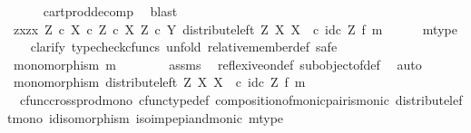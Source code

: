 \begin{isabellebody}
\ \ \ \ \isamarkupfalse%
\ cart{\isacharunderscore}{\kern0pt}prod{\isacharunderscore}{\kern0pt}decomp\ \isamarkupfalse%
\ blast\isanewline
\ \ \isamarkupfalse%
\ \isamarkupfalse%
\ {\isachardoublequoteopen}{\isasymlangle}zx{\isacharcomma}{\kern0pt}zx{\isasymrangle}\ {\isasymin}\isactrlbsub {\isacharparenleft}{\kern0pt}Z\ {\isasymtimes}\isactrlsub c\ X{\isacharparenright}{\kern0pt}\ {\isasymtimes}\isactrlsub c\ Z\ {\isasymtimes}\isactrlsub c\ X\isactrlesub \ {\isacharparenleft}{\kern0pt}Z\ {\isasymtimes}\isactrlsub c\ Y{\isacharcomma}{\kern0pt}\ distribute{\isacharunderscore}{\kern0pt}left\ Z\ X\ X\ \ {\isasymcirc}\isactrlsub c\ {\isacharparenleft}{\kern0pt}id\isactrlsub c\ Z\ {\isasymtimes}\isactrlsub f\ m{\isacharparenright}{\kern0pt}{\isacharparenright}{\kern0pt}{\isachardoublequoteclose}\isanewline
\ \ \ \ \isamarkupfalse%
\ m{\isacharunderscore}{\kern0pt}type\isanewline
\ \ \isamarkupfalse%
\ {\isacharparenleft}{\kern0pt}clarify{\isacharcomma}{\kern0pt}\ typecheck{\isacharunderscore}{\kern0pt}cfuncs{\isacharcomma}{\kern0pt}\ unfold\ relative{\isacharunderscore}{\kern0pt}member{\isacharunderscore}{\kern0pt}def{}{\isacharcomma}{\kern0pt}\ safe{\isacharparenright}{\kern0pt}\isanewline
\ \ \ \ \isamarkupfalse%
\ {\isachardoublequoteopen}monomorphism\ m{\isachardoublequoteclose}\isanewline
\ \ \ \ \ \ \isamarkupfalse%
\ assms\ \isamarkupfalse%
\ reflexive{\isacharunderscore}{\kern0pt}on{\isacharunderscore}{\kern0pt}def\ subobject{\isacharunderscore}{\kern0pt}of{\isacharunderscore}{\kern0pt}def{}\ \isamarkupfalse%
\ auto\isanewline
\ \ \ \ \isamarkupfalse%
\ \isamarkupfalse%
\ {\isachardoublequoteopen}monomorphism\ {\isacharparenleft}{\kern0pt}distribute{\isacharunderscore}{\kern0pt}left\ Z\ X\ X\ \ {\isasymcirc}\isactrlsub c\ {\isacharparenleft}{\kern0pt}id\isactrlsub c\ Z\ {\isasymtimes}\isactrlsub f\ m{\isacharparenright}{\kern0pt}{\isacharparenright}{\kern0pt}{\isachardoublequoteclose}\isanewline
\ \ \ \ \ \ \isamarkupfalse%
\ \ cfunc{\isacharunderscore}{\kern0pt}cross{\isacharunderscore}{\kern0pt}prod{\isacharunderscore}{\kern0pt}mono\ cfunc{\isacharunderscore}{\kern0pt}type{\isacharunderscore}{\kern0pt}def\ composition{\isacharunderscore}{\kern0pt}of{\isacharunderscore}{\kern0pt}monic{\isacharunderscore}{\kern0pt}pair{\isacharunderscore}{\kern0pt}is{\isacharunderscore}{\kern0pt}monic\ distribute{\isacharunderscore}{\kern0pt}left{\isacharunderscore}{\kern0pt}mono\ id{\isacharunderscore}{\kern0pt}isomorphism\ iso{\isacharunderscore}{\kern0pt}imp{\isacharunderscore}{\kern0pt}epi{\isacharunderscore}{\kern0pt}and{\isacharunderscore}{\kern0pt}monic\ m{\isacharunderscore}{\kern0pt}type\ \isamarkupfalse%

\end{isabellebody}
